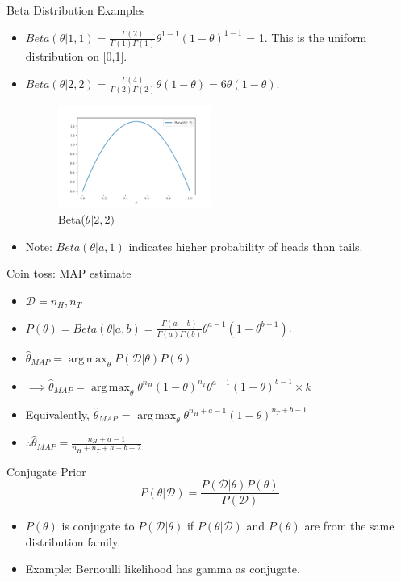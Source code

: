 \documentclass{beamer}
\DeclareMathOperator*{\argmax}{arg\,max}
\begin{document}
\begin{frame}{Beta Distribution Examples}
\begin{itemize}
 \item $Beta(\theta | 1, 1) = \frac{\Gamma(2)}{\Gamma(1)\Gamma(1)}\theta^{1 - 1}(1 - \theta)^{1 - 1}$ = 1. This is the uniform distribution on [0,1].
 \item  $Beta(\theta | 2, 2) = \frac{\Gamma(4)}{\Gamma(2)\Gamma(2)}\theta(1 - \theta) = 6\theta(1 - \theta)$. 
 
 \begin{figure}[htp]
    \centering
    \includegraphics[width=5cm]{plots/beta22.pdf}
    \caption{Beta($\theta|2,2)$}
    \label{fig:beta22}
\end{figure}
\item Note: $Beta(\theta | a, 1)$ indicates higher probability of heads than tails.

 \end{itemize}
\end{frame}

\begin{frame}{Coin toss: MAP estimate}
\begin{itemize}
    
\item $\mathcal{D} = n_H, n_T$
\item $P(\theta) = Beta(\theta | a, b) = \frac{\Gamma(a + b)}{\Gamma(a)\Gamma(b)}\theta^{a - 1}(1 - \theta^{b - 1})$.
\item $\hat{\theta}_{MAP} =\argmax_\theta P(\mathcal{D}|\theta)P(\theta)$ 
\item   $\implies \hat{\theta}_{MAP} =  \argmax_\theta \theta^{n_H}(1 - \theta)^{n_T}\theta^{a - 1}(1 - \theta)^{b -1} \times k$
\item Equivalently, $\hat{\theta}_{MAP}$ = $\argmax_\theta \theta^{n_H + a - 1}(1 - \theta)^{n_T + b - 1}$
\item $\therefore \hat{\theta}_{MAP} = \frac{n_H + a - 1}{n_H + n_T + a + b - 2}$
\end{itemize}
\end{frame}

\begin{frame}{Conjugate Prior}
	\begin{equation*}
	    P(\theta | \mathcal{D}) = \frac{ P(\mathcal{D}|\theta)P(\theta) }{P(\mathcal{D})}
	\end{equation*}
\begin{itemize}
    \item $P(\theta)$ is conjugate to $P(\mathcal{D}|\theta)$ if $P(\theta | \mathcal{D})$ and $P(\theta)$ are from the same distribution family.
    \item Example: Bernoulli likelihood has gamma as conjugate.
\end{itemize}
\end{frame}
\end{document}

